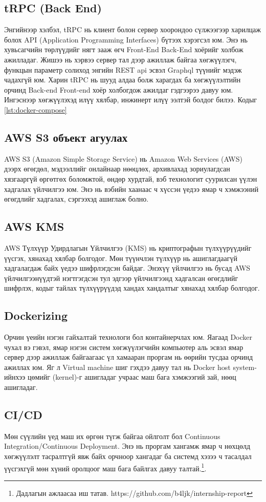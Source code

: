 \subsection{tRPC (Back End)}

Энгийнээр хэлбэл, tRPC нь клиент болон сервер хоорондоо сүлжээгээр харилцаж болох API (Application Programming Interfaces) бүтээх хэрэгсэл юм. Энэ нь хувьсагчийн төрлүүдийг нягт зааж өгч Front-End Back-End хоёрийг холбож ажилладаг. Жишээ нь хэрвээ сервер тал дээр ажиллаж байгаа хөгжүүлэгч, функцын параметр солиход энгийн REST api эсвэл Graphql түүнийг мэдэж чадахгүй юм. Харин tRPC нь шууд алдаа болж харагдах ба хөгжүүлэлтийн орчинд Back-end Front-end хоёр холбогдож ажилдаг гэдгээрээ давуу юм. Ингэснээр хөгжүүлэхэд илүү хялбар, инжинерт илүү ээлтэй болдог билээ.
Кодыг \ref{lst:docker-compose} 
\subsection{AWS S3 объект агуулах}
AWS S3 (Amazon Simple Storage Service) нь Amazon Web Services (AWS) дээрх өгөгдөл, мэдээллийг онлайнаар нөөцлөх, архивлахад зориулагдсан хязгааргүй өргөтгөх боломжтой, өндөр хурдтай, вэб технологит суурилсан үүлэн хадгалах үйлчилгээ юм. Энэ нь вэбийн хаанаас ч хүссэн үедээ ямар ч хэмжээний өгөгдлийг хадгалах, сэргээхэд ашиглаж болно.
\subsection{AWS KMS}
AWS Түлхүүр Удирдлагын Үйлчилгээ (KMS) нь криптографын түлхүүрүүдийг үүсгэх, хянахад хялбар болгодог. Мөн түүнчлэн түлхүүр нь ашиглагдаагүй хадгалагдаж байх үедээ шифрлэгдсэн байдаг.
Энэхүү үйлчилгээ нь бусад AWS үйлчилгээнүүдтэй нэгтгэгдсэн тул эдгээр үйлчилгээнд хадгалсан өгөгдлийг шифрлэх, кодыг тайлах түлхүүрүүдэд хандах хандалтыг хянахад хялбар болгодог.

\subsection{Dockerizing}
Орчин үеийн нэгэн гайхалтай технологи бол контайнерчлах юм. Яагаад Docker чухал вэ гэвэл, ямар нэгэн систем хөгжүүлэгчийн компьютер аль эсвэл ямар сервер дээр ажиллаж байгаагаас үл хамааран проргам нь өөрийн тусдаа орчинд ажиллах юм. Яг л Virtual machine шиг гэхдээ давуу тал нь Docker host system-ийнхээ цөмийг (kernel)-г ашигладаг учраас маш бага хэмжээгий зай, нөөц ашигладаг.
\subsection{CI/CD}
Мөн сүүлийн үед маш их өргөн түгж байгаа ойлголт бол Continuous Integration/Continuous Deployment.
Энэ нь проргам хангамж ямар ч нөхцөлд хөгжүүлэлт тасралтгүй явж байх орчноор хангадаг ба системд хэзээ ч тасалдал үүсгэхгүй мөн хүний оролцоог маш бага байлгах давуу талтай.\footnote{Дадлагын ажлаасаа иш татав. https://github.com/b4ljk/internship-report}.

